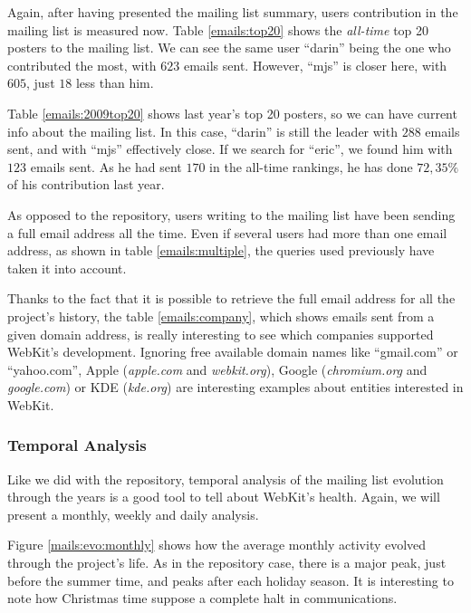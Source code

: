 Again, after having presented the mailing list summary, users contribution in the mailing list is measured now. Table \ref{emails:top20} shows the {\it all-time} top 20 posters to the mailing list. We can see the same user ``darin'' being the one who contributed the most, with $623$ emails sent. However, ``mjs'' is closer here, with $605$, just $18$ less than him. 



Table \ref{emails:2009top20} shows last year's top 20 posters, so we can have current info about the mailing list. In this case, ``darin'' is still the leader with $288$ emails sent, and with ``mjs'' effectively close. If we search for ``eric'', we found him with $123$ emails sent. As he had sent $170$ in the all-time rankings, he has done $72,35\%$ of his contribution last year.



As opposed to the repository, users writing to the mailing list have been sending a full email address all the time. Even if several users had more than one email address, as shown in table \ref{emails:multiple}, the queries used previously have taken it into account. 



Thanks to the fact that it is possible to retrieve the full email address for all the project's history, the table \ref{emails:company}, which shows emails sent from a given domain address, is really interesting to see which companies supported WebKit's development. Ignoring free available domain names like ``gmail.com'' or ``yahoo.com'', Apple ({\it apple.com} and {\it webkit.org}), Google ({\it chromium.org} and {\it google.com}) or KDE ({\it kde.org}) are interesting examples about entities interested in WebKit. 



\subsubsection{Temporal Analysis}

Like we did with the repository, temporal analysis of the mailing list evolution through the years is a good tool to tell about WebKit's health. Again, we will present a monthly, weekly and daily analysis.

Figure \ref{mails:evo:monthly} shows how the average monthly activity evolved through the project's life. As in the repository case, there is a major peak, just before the summer time, and peaks after each holiday season. It is interesting to note how Christmas time suppose a complete halt in communications.

